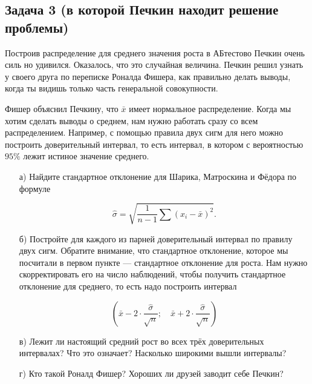\documentclass[12pt, a4paper, oneside]{article}
\begin{document}
\subsection*{Задача 3 (в которой Печкин находит решение проблемы)} 

Построив распределение для среднего значения роста в АБтестово Печкин очень силь но удивился. Оказалось, что это случайная величина. Печкин решил узнать у своего друга по переписке Роналда Фишера, как правильно делать выводы, когда ты видишь только часть генеральной совокупности. 

Фишер объяснил Печкину, что $\bar x$ имеет нормальное распределение. Когда мы хотим сделать выводы о среднем, нам нужно работать сразу со всем распределением. Например, с помощью правила двух сигм для него можно построить доверительный интервал, то есть интервал, в котором с вероятностью $95\%$ лежит истиное значение среднего.  

\begin{enumerate}
	\item[а)] Найдите стандартное отклонение для Шарика, Матроскина и Фёдора по формуле 
	
	\[\hat \sigma = \sqrt{ \frac{1}{n-1}  \sum (x_i - \bar x)^2}.\]
	
	\item[б)] Постройте для каждого из парней доверительный интервал по правилу двух сигм. Обратите внимание, что стандартное отклонение, которое мы посчитали в первом пункте --- стандартное отклонение для роста. Нам нужно скорректировать его на число наблюдений, чтобы получить стандартное отклонение для среднего, то есть надо построить интервал
	
	\[ \left( \bar x - 2 \cdot \frac{\hat \sigma}{\sqrt{n}}; \quad \bar x + 2 \cdot \frac{\hat \sigma}{\sqrt{n}} \right)\] 
	
	\item[в)] Лежит ли настоящий средний рост во всех трёх доверительных интервалах? Что это означает? Насколько широкими вышли интервалы? 
		
	\item[г)] Кто такой Роналд Фишер? Хороших ли друзей заводит себе Печкин?
\end{enumerate}
\end{document}
